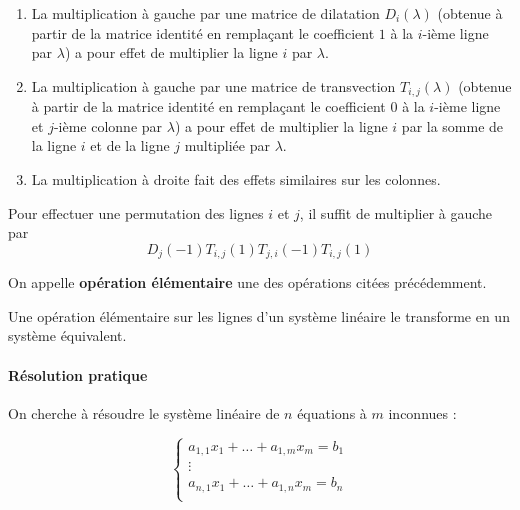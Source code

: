   \begin{theorem}
    \begin{enumerate}[label=(\roman*)]
      \item La multiplication à gauche par une matrice de dilatation $D_i(\lambda)$ (obtenue à partir de la matrice identité en remplaçant le coefficient $1$ à la $i$-ième ligne par $\lambda$) a pour effet de multiplier la ligne $i$ par $\lambda$.
      \item La multiplication à gauche par une matrice de transvection $T_{i,j}(\lambda)$ (obtenue à partir de la matrice identité en remplaçant le coefficient $0$ à la $i$-ième ligne et $j$-ième colonne par $\lambda$) a pour effet de multiplier la ligne $i$ par la somme de la ligne $i$ et de la ligne $j$ multipliée par $\lambda$.
      \item La multiplication à droite fait des effets similaires sur les colonnes.
    \end{enumerate}
  \end{theorem}

  \begin{remark}
    Pour effectuer une permutation des lignes $i$ et $j$, il suffit de multiplier à gauche par
    \[ D_j(-1)T_{i,j}(1)T_{j,i}(-1)T_{i,j}(1) \]
  \end{remark}

  \begin{definition}
    On appelle \textbf{opération élémentaire} une des opérations citées précédemment.
  \end{definition}

  \begin{theorem}
    Une opération élémentaire sur les lignes d'un système linéaire le transforme en un système équivalent.
  \end{theorem}

  \paragraph{Résolution pratique}

  On cherche à résoudre  le système linéaire de $n$ équations à $m$ inconnues :

  \[
  \begin{cases}
    a_{1,1} x_1 + \dots + a_{1,m} x_m = b_1 \\
    \vdots \\
    a_{n,1} x_1 + \dots + a_{1,n} x_m = b_n \\
  \end{cases}
  \tag{$S$}
  \]


